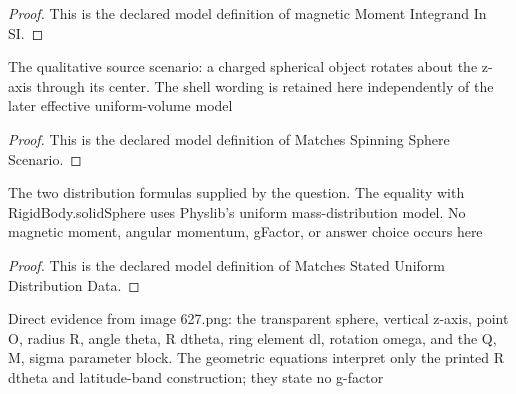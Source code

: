 \begin{proof}
  This is the declared model definition of magnetic Moment Integrand In SI.
\end{proof}
\begin{definition}
  \label{def:physics:phyx-mini-0627:phyxminiproblems-problemphyxmini0627-matchesspinningspherescenario}
  The qualitative source scenario: a charged spherical object rotates about the z-axis through its center. The shell wording is retained here independently of the later effective uniform-volume model
\end{definition}
\begin{proof}
  This is the declared model definition of Matches Spinning Sphere Scenario.
\end{proof}
\begin{definition}
  \label{def:physics:phyx-mini-0627:phyxminiproblems-problemphyxmini0627-matchesstateduniformdistributiondata}
  The two distribution formulas supplied by the question. The equality with RigidBody.solidSphere uses Physlib's uniform mass-distribution model. No magnetic moment, angular momentum, gFactor, or answer choice occurs here
\end{definition}
\begin{proof}
  This is the declared model definition of Matches Stated Uniform Distribution Data.
\end{proof}
\begin{definition}
  \label{def:physics:phyx-mini-0627:phyxminiproblems-problemphyxmini0627-matchessuppliedrotatingspherefigure}
  Direct evidence from image 627.png: the transparent sphere, vertical z-axis, point O, radius R, angle theta, R dtheta, ring element dl, rotation omega, and the Q, M, sigma parameter block. The geometric equations interpret only the printed R dtheta and latitude-band construction; they state no g-factor
\end{definition}
